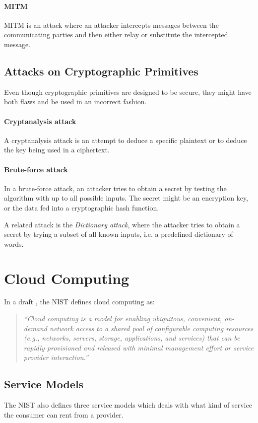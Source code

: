 \documentclass[pdftex,english,10pt,b5paper,twoside]{book}
\begin{document}
\paragraph{\acl{MITM}} \ac{MITM} is an attack where an attacker intercepts messages
between the communicating parties and then either relay or substitute the
intercepted message.

\subsection{Attacks on Cryptographic Primitives}
Even though cryptographic primitives are designed to be secure, they might have
both flaws and be used in an incorrect fashion.

\paragraph{Cryptanalysis attack} A cryptanalysis attack is an attempt to deduce
a specific plaintext or to deduce the key being used in a ciphertext.

\paragraph{Brute-force attack} In a brute-force attack, an attacker tries
to obtain a secret by testing the algorithm with up to all possible inputs. The
secret might be an encryption key, or the data fed into a cryptographic hash
function.

A related attack is the \emph{Dictionary attack}, where the attacker
tries to obtain a secret by trying a subset of all known inputs, i.e. a
predefined dictionary of words.

\section{Cloud Computing}

In a draft \cite{cloud_nistdef}, the \ac{NIST} defines cloud computing as:
\begin{quote}\it
``Cloud computing is a model for enabling ubiquitous, convenient,
on-demand network access to a shared pool of configurable computing resources
(e.g., networks, servers, storage, applications, and services) that can be
rapidly provisioned and released with minimal management effort or service
provider interaction.''
\end{quote}

\subsection{Service Models}
The \ac{NIST} also defines three service models which deals with what kind of
service the consumer can rent from a provider.
\end{document}
